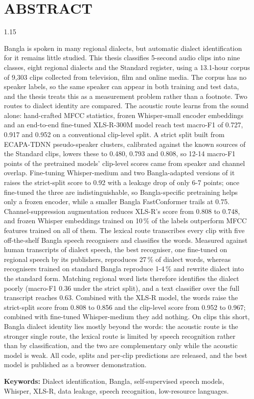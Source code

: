 \chapter*{ABSTRACT}
\begin{spacing}{1.15}

Bangla is spoken in many regional dialects, but automatic dialect identification
for it remains little studied. This thesis classifies 5-second audio clips into
nine classes, eight regional dialects and the Standard register, using a
13.1-hour corpus of 9,303 clips collected from television, film and online
media. The corpus has no speaker labels, so the same speaker can appear in both
training and test data, and the thesis treats this as a measurement problem
rather than a footnote. Two routes to dialect identity are compared. The
acoustic route learns from the sound alone: hand-crafted MFCC statistics, frozen
Whisper-small encoder embeddings and an end-to-end fine-tuned XLS-R-300M model
reach test macro-F1 of 0.727, 0.917 and 0.952 on a conventional clip-level
split. A strict split built from ECAPA-TDNN pseudo-speaker clusters, calibrated
against the known sources of the Standard clips, lowers these to 0.480, 0.793
and 0.808, so 12-14 macro-F1 points of the pretrained models' clip-level
scores came from speaker and channel overlap. Fine-tuning Whisper-medium and
two Bangla-adapted versions of it raises the strict-split score to 0.92 with a
leakage drop of only 6-7 points; once fine-tuned the three are
indistinguishable, so Bangla-specific pretraining helps only a frozen encoder,
while a smaller Bangla FastConformer trails at 0.75. Channel-suppression
augmentation reduces XLS-R's score from 0.808 to 0.748, and frozen Whisper
embeddings trained on 10\,\% of the labels outperform MFCC features trained on
all of them. The lexical route transcribes every clip with five off-the-shelf
Bangla speech recognisers and classifies the words. Measured against human
transcripts of dialect speech, the best recogniser, one fine-tuned on regional
speech by its publishers, reproduces 27\,\% of dialect words, whereas
recognisers trained on standard Bangla reproduce 1-4\,\% and rewrite dialect
into the standard form. Matching regional word lists therefore identifies the
dialect poorly (macro-F1 0.36 under the strict split), and a text classifier
over the full transcript reaches 0.63. Combined with the XLS-R model, the words
raise the strict-split score from 0.808 to 0.856 and the clip-level score from
0.952 to 0.967; combined with fine-tuned Whisper-medium they add nothing. On
clips this short, Bangla dialect identity lies mostly beyond the words: the
acoustic route is the stronger single route, the lexical route is limited by
speech recognition rather than by classification, and the two are complementary
only while the acoustic model is weak. All code, splits and per-clip predictions
are released, and the best model is published as a browser demonstration.

\medskip
\noindent\textbf{Keywords:} Dialect identification, Bangla, self-supervised speech
models, Whisper, XLS-R, data leakage, speech recognition, low-resource languages.
\end{spacing}
